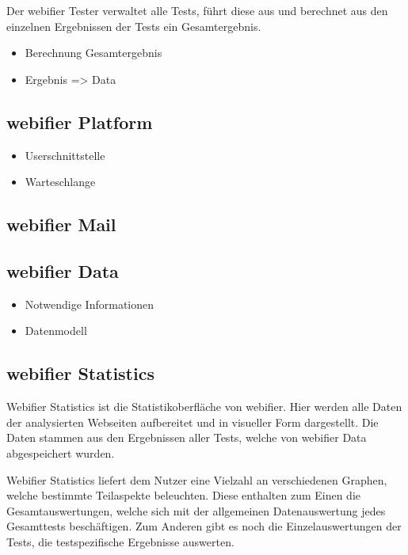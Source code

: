 Der webifier Tester verwaltet alle Tests, führt diese aus und berechnet aus den einzelnen Ergebnissen der Tests ein Gesamtergebnis.


\begin{itemize}
  \item Berechnung Gesamtergebnis
  \item Ergebnis => Data
\end{itemize}

\subsection{webifier Platform}


\begin{itemize}
  \item Userschnittstelle
  \item Warteschlange
\end{itemize}

\subsection{webifier Mail}


\subsection{webifier Data}


\begin{itemize}
  \item Notwendige Informationen
  \item Datenmodell
\end{itemize}

\subsection{webifier Statistics}
Webifier Statistics ist die Statistikoberfläche von webifier. Hier werden alle Daten der analysierten Webseiten aufbereitet und in visueller Form dargestellt. Die Daten stammen aus den Ergebnissen aller Tests, welche von webifier Data abgespeichert wurden.

Webifier Statistics liefert dem Nutzer eine Vielzahl an verschiedenen Graphen, welche bestimmte Teilaspekte beleuchten. Diese enthalten zum Einen die Gesamtauswertungen, welche sich mit der allgemeinen Datenauswertung jedes Gesamttests beschäftigen. Zum Anderen gibt es noch die Einzelauswertungen der Tests, die testspezifische Ergebnisse auswerten.

